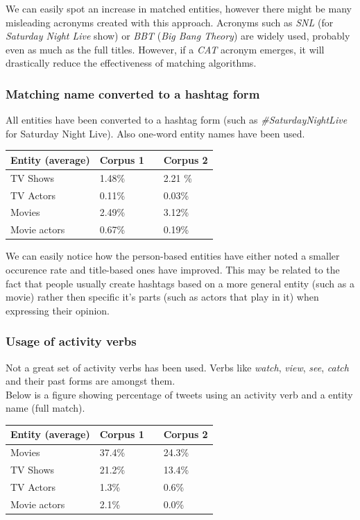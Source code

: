 \documentclass{article}
\begin{document}
We can easily spot an increase in matched entities, however there might be many
misleading acronyms created with this approach. Acronyms such as \textit{SNL}
(for \textit{Saturday Night Live} show) or  \textit{BBT} (\textit{Big Bang
Theory}) are widely used, probably even as much as the full titles. However,
if a \textit{CAT} acronym emerges, it will drastically reduce the effectiveness
of matching algorithms.

\subsubsection{Matching name converted to a hashtag form}
All entities have been converted to a hashtag form (such as
\textit{\#SaturdayNightLive} for Saturday Night Live). Also one-word entity
names have been used.

\begin{center}
  \begin{tabular}{ | p{4cm} | p{2cm} | p{1cm}| p{2cm} | } \hline
    Entity (average) & Corpus 1 & & Corpus 2 \\ \hline
    TV Shows & 1.48\% & & 2.21 \% \\ \hline
    TV Actors & 0.11\% & & 0.03\% \\ \hline
    Movies & 2.49\% & & 3.12\% \\ \hline
    Movie actors & 0.67\% & & 0.19\% \\ \hline
  \end{tabular}
\end{center}

We can easily notice how the person-based entities have either noted a smaller
occurence rate and title-based ones have improved. This may be related to the
fact that people usually create hashtags based on a more general entity (such as
    a movie) rather then specific it's parts (such as actors that play in it)
when expressing their opinion.

\subsubsection{Usage of activity verbs}
Not a great set of activity verbs has been used. Verbs like \textit{watch},
\textit{view}, \textit{see}, \textit{catch} and their past forms are 
amongst them. \\
Below is a figure showing percentage of tweets using an activity verb 
and a entity name (full match).

\begin{center}
  \begin{tabular}{ | p{4cm} | p{2cm} | p{1cm}| p{2cm} | } \hline
    Entity (average) & Corpus 1 & & Corpus 2 \\ \hline
    Movies & 37.4\% & & 24.3\% \\ \hline
    TV Shows & 21.2\% & & 13.4\% \\ \hline
    TV Actors & 1.3\% & & 0.6\% \\ \hline
    Movie actors & 2.1\% & & 0.0\% \\ \hline
  \end{tabular}
\end{center}
\end{document}
